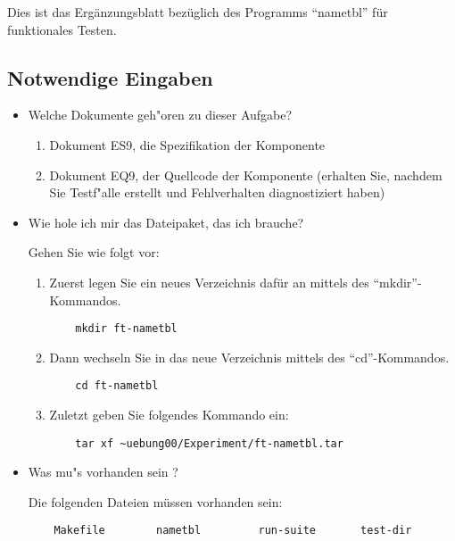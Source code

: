 
Dies ist das Erg\"anzungsblatt bez\"uglich des Programms "`nametbl"'
f\"ur funktionales Testen.

\subsection*{Notwendige Eingaben}

\begin{itemize}

\item Welche Dokumente geh"oren zu dieser Aufgabe?

\begin{enumerate}
\item Dokument ES9, die Spezifikation der Komponente
\item Dokument EQ9, der Quellcode der Komponente (erhalten Sie, nachdem Sie
	Testf"alle erstellt und Fehlverhalten diagnostiziert haben)
\end{enumerate}

\item Wie hole ich mir das Dateipaket, das ich brauche?

Gehen Sie wie folgt vor:

\begin{enumerate}

\item Zuerst legen Sie ein neues Verzeichnis daf\"ur an mittels des 
"`mkdir"'-Kommandos.
\begin{verbatim}
    mkdir ft-nametbl
\end{verbatim}

\item Dann wechseln Sie in das neue Verzeichnis mittels des 
"`cd"'-Kommandos.
\begin{verbatim}
    cd ft-nametbl
\end{verbatim}

\item Zuletzt geben Sie folgendes Kommando ein:
\begin{verbatim}
    tar xf ~uebung00/Experiment/ft-nametbl.tar
\end{verbatim}

\end{enumerate}

\item Was mu"s vorhanden sein ?

Die folgenden Dateien m\"ussen vorhanden sein:
\begin{verbatim}
    Makefile        nametbl         run-suite       test-dir
\end{verbatim}

\end{itemize}

